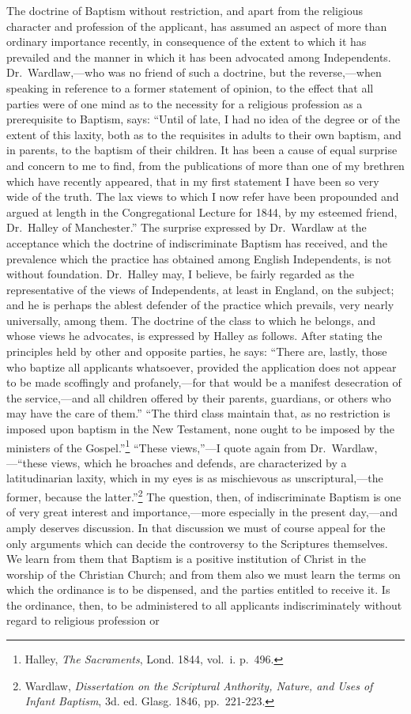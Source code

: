 \documentclass[english,]{book}
\begin{document}
The doctrine of Baptism without restriction, and apart from the religious character and profession of the applicant, has assumed an aspect of more than ordinary importance recently, in consequence of the extent to which it has prevailed and the manner in which it has been advocated among Independents. Dr.~Wardlaw,---who was no friend of such a doctrine, but the reverse,---when speaking in reference to a former statement of opinion, to the effect that all parties were of one mind as to the necessity for a religious profession as a prerequisite to Baptism, says: ``Until of late, I had no idea of the degree or of the extent of this laxity, both as to the requisites in adults to their own baptism, and in parents, to the baptism of their children. It has been a cause of equal surprise and concern to me to find, from the publications of more than one of my brethren which have recently appeared, that in my first statement I have been so very wide of the truth. The lax views to which I now refer have been propounded and argued at length in the Congregational Lecture for 1844, by my esteemed friend, Dr.~Halley of Manchester.'' The surprise expressed by Dr.~Wardlaw at the acceptance which the doctrine of indiscriminate Baptism has received, and the prevalence which the practice has obtained among English Independents, is not without foundation. Dr.~Halley may, I believe, be fairly regarded as the representative of the views of Independents, at least in England, on the subject; and he is perhaps the ablest defender of the practice which prevails, very nearly universally, among them. The doctrine of the class to which he belongs, and whose views he advocates, is expressed by Halley as follows. After stating the principles held by other and opposite parties, he says: ``There are, lastly, those who baptize all applicants whatsoever, provided the application does not appear to be made scoffingly and profanely,---for that would be a manifest desecration of the service,---and all children offered by their parents, guardians, or others who may have the care of them.'' ``The third class maintain that, as no restriction is imposed upon baptism in the New Testament, none ought to be imposed by the ministers of the Gospel.''\footnote{Halley, \emph{The Sacraments}, Lond. 1844, vol.~i. p.~496.} ``These views,''---I quote again from Dr.~Wardlaw,---``these views, which he broaches and defends, are characterized by a latitudinarian laxity, which in my eyes is as mischievous as unscriptural,---the former, because the latter.''\footnote{Wardlaw, \emph{Dissertation on the Scriptural Anthority, Nature, and Uses of Infant Baptism}, 3d. ed. Glasg. 1846, pp.~221-223.} The question, then, of indiscriminate Baptism is one of very great interest and importance,---more especially in the present day,---and amply deserves discussion. In that discussion we must of course appeal for the only arguments which can decide the controversy to the Scriptures themselves. We learn from them that Baptism is a positive institution of Christ in the worship of the Christian Church; and from them also we must learn the terms on which the ordinance is to be dispensed, and the parties entitled to receive it. Is the ordinance, then, to be administered to all applicants indiscriminately without regard to religious profession or 
\end{document}
